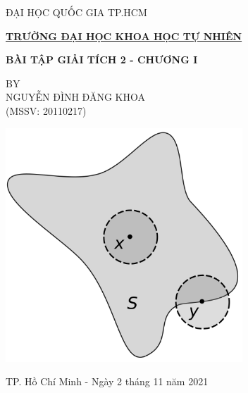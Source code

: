 
\newcommand\nbvspace[1][3]{\vspace*{\stretch{#1}}}
\newcommand\nbstretchyspace{\spaceskip0.5em plus 0.25em minus 0.25em}
\newcommand{\nbtitlestretch}{\spaceskip0.6em}
\thispagestyle{empty}
\begin{tcolorbox}
\begin{center}

\vspace{1.2cm}
\centerline{ĐẠI HỌC QUỐC GIA TP.HCM}
\centerline{\bf\underline{TRƯỜNG ĐẠI HỌC KHOA HỌC TỰ NHIÊN}}
\vspace{2.8cm}

\nbvspace[1]
\Huge
{\huge\textbf{
BÀI TẬP GIẢI TÍCH 2 - CHƯƠNG I}}

\normalsize

\vspace{0.5cm}

\small BY\\[0.6em]
\Large NGUYỄN ĐÌNH ĐĂNG KHOA\\
\Large (MSSV: 20110217)

\vspace{2.8cm}

\includegraphics[width=3.5in]{./assets/interior-bw}

\vspace{2.9cm}

\normalsize

TP. Hồ Chí Minh - Ngày 2 tháng 11 năm 2021
\vspace{1.5cm}
\nbvspace[1]

\end{center}
\end{tcolorbox}

\pagebreak
\clearpage
\restoregeometry
